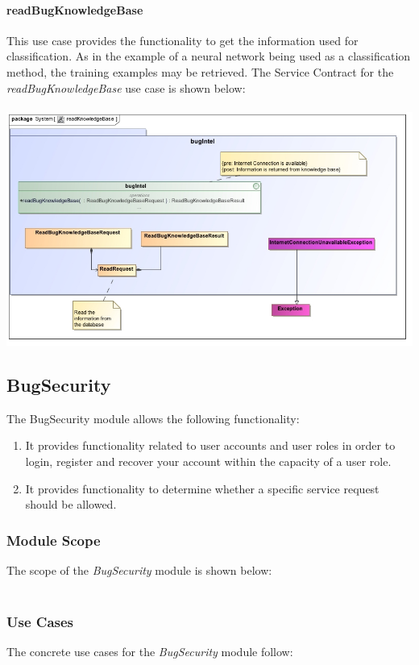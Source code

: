 \documentclass[11pt,a4paper,titlepage]{article}
\begin{document}
		\paragraph{readBugKnowledgeBase }
				This use case provides the functionality to get the information used for classification. As in the example of a neural network being used as a classification method, the training examples may be retrieved.	
		The Service Contract for the \textit{readBugKnowledgeBase} use case is shown below:\\\hfill\\
		\includegraphics[width=\linewidth]{readKnowledgeBase}
		
		
	\subsection{BugSecurity}
	The BugSecurity module allows the following functionality:
	\begin{enumerate}
		\item It provides functionality related to user accounts and user roles in order to login, register and recover your account within the capacity of a user role.
		\item It provides functionality to determine whether a specific service request should be allowed.
	\end{enumerate}
		\subsubsection{Module Scope}
		The scope of the \textit{BugSecurity} module is shown below:\\
		\hfill\\
		\subsubsection{Use Cases}
		The concrete use cases for the \textit{BugSecurity} module follow:
		
\end{document}
